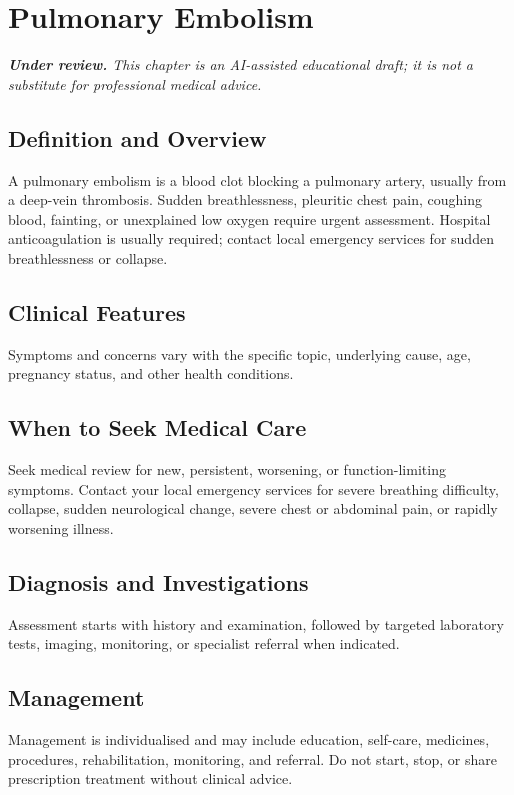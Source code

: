 \chapter{Pulmonary Embolism}

\medskip
\noindent\textit{\textbf{Under review.} This chapter is an AI-assisted educational draft; it is not a substitute for professional medical advice.}

\section*{Definition and Overview}
A pulmonary embolism is a blood clot blocking a pulmonary artery, usually from a deep-vein thrombosis. Sudden breathlessness, pleuritic chest pain, coughing blood, fainting, or unexplained low oxygen require urgent assessment. Hospital anticoagulation is usually required; contact local emergency services for sudden breathlessness or collapse.

\section*{Clinical Features}
Symptoms and concerns vary with the specific topic, underlying cause, age, pregnancy status, and other health conditions.

\section*{When to Seek Medical Care}
Seek medical review for new, persistent, worsening, or function-limiting symptoms. Contact your local emergency services for severe breathing difficulty, collapse, sudden neurological change, severe chest or abdominal pain, or rapidly worsening illness.

\section*{Diagnosis and Investigations}
Assessment starts with history and examination, followed by targeted laboratory tests, imaging, monitoring, or specialist referral when indicated.

\section*{Management}
Management is individualised and may include education, self-care, medicines, procedures, rehabilitation, monitoring, and referral. Do not start, stop, or share prescription treatment without clinical advice.

